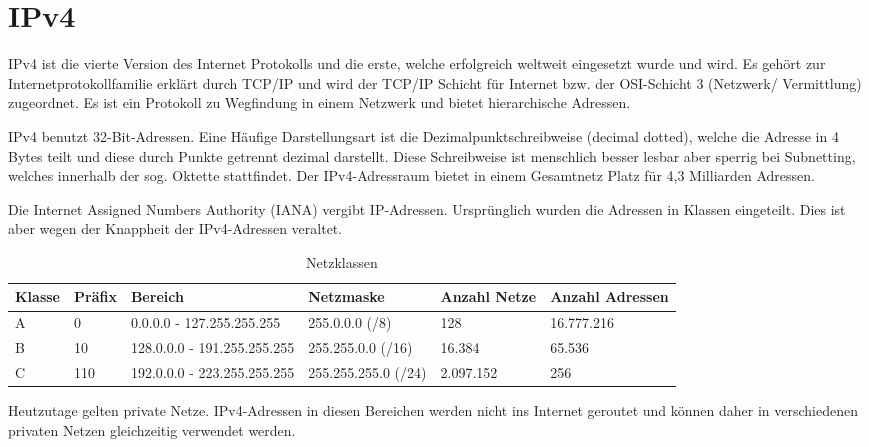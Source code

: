 \section{IPv4}

IPv4 ist die vierte Version des Internet Protokolls und die erste, welche erfolgreich weltweit eingesetzt wurde und wird. Es gehört zur Internetprotokollfamilie erklärt durch TCP/IP und wird der TCP/IP Schicht für Internet bzw. der OSI-Schicht 3 (Netzwerk/ Vermittlung) zugeordnet. Es ist ein Protokoll zu Wegfindung in einem Netzwerk und bietet hierarchische Adressen.

IPv4 benutzt 32-Bit-Adressen. Eine Häufige Darstellungsart ist die Dezimalpunktschreibweise (decimal dotted), welche die Adresse in 4 Bytes teilt und diese durch Punkte getrennt dezimal darstellt. Diese Schreibweise ist menschlich besser lesbar aber sperrig bei Subnetting, welches innerhalb der sog. Oktette stattfindet. Der IPv4-Adressraum bietet in einem Gesamtnetz Platz für 4,3 Milliarden Adressen.

Die Internet Assigned Numbers Authority (IANA) vergibt IP-Adressen. Ursprünglich wurden die Adressen in Klassen eingeteilt. Dies ist aber wegen der Knappheit der IPv4-Adressen veraltet.

\begin{table}
    [H]
    \centering
    \begin{tabulary}{\textwidth}{|l|l|L|L|l|l|}
        \hline
        \textbf{Klasse} & \textbf{Präfix} & \textbf{Bereich}            & \textbf{Netzmaske}  & \textbf{Anzahl Netze} & \textbf{Anzahl Adressen} \\\hline
        A               & 0               & 0.0.0.0 - 127.255.255.255   & 255.0.0.0 (/8)      & 128                   & 16.777.216               \\\hline
        B               & 10              & 128.0.0.0 - 191.255.255.255 & 255.255.0.0 (/16)   & 16.384                & 65.536                   \\\hline
        C               & 110             & 192.0.0.0 - 223.255.255.255 & 255.255.255.0 (/24) & 2.097.152             & 256                      \\\hline
    \end{tabulary}
    \caption{Netzklassen}
\end{table}

Heutzutage gelten private Netze. IPv4-Adressen in diesen Bereichen werden nicht ins Internet geroutet und können daher in verschiedenen privaten Netzen gleichzeitig verwendet werden.

